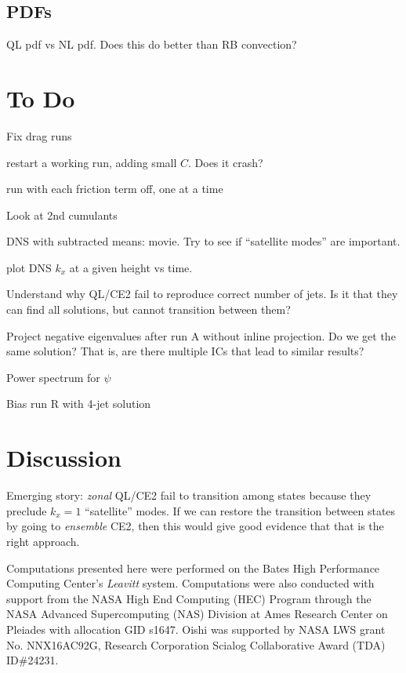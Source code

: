 \documentclass{jfm}
\newcommand{\cmark}{\ding{51}}%
\newcommand{\done}{\rlap{$\square$}{\raisebox{2pt}{\large\hspace{1pt}\cmark}}%
\hspace{-2.5pt}}
\begin{document}
\subsection{PDFs}
\label{sec:pdf}

QL pdf vs NL pdf.
Does this do better than RB convection?

\section{To Do}
\label{sec:todo}

\begin{todolist}
  \item[\done] Fix drag runs
    \begin{todolist}
      \item[\done] restart a working run, adding small $C$. Does it crash?
      \item[\done] run with each friction term off, one at a time
    \end{todolist}
  \item[\done] Look at 2nd cumulants
  \item DNS with subtracted means: movie. Try to see if ``satellite modes'' are important.
  \item plot DNS $k_x$ at a given height vs time.
  \item Understand why QL/CE2 fail to reproduce correct number of jets. Is it that they can find all solutions, but cannot transition between them?
  \item Project negative eigenvalues after run A without inline projection. Do we get the same solution? That is, are there multiple ICs that lead to similar results?
  \item Power spectrum for $\psi$
  \item[\done] Bias run R with 4-jet solution
\end{todolist}

\section{Discussion}
\label{sec:discussion}

Emerging story: \emph{zonal} QL/CE2 fail to transition among states because they preclude $k_x = 1$ ``satellite'' modes. If we can restore the transition between states by going to \emph{ensemble} CE2, then this would give good evidence that that is the right approach.


Computations presented here were performed on the Bates High Performance Computing Center's \emph{Leavitt} system.
Computations were also conducted with support from the NASA High End Computing (HEC) Program through the NASA Advanced Supercomputing (NAS) Division at Ames Research
Center on Pleiades with allocation GID s1647.
Oishi was supported by NASA LWS grant No. NNX16AC92G, Research Corporation Scialog Collaborative Award (TDA) ID\#24231.
\end{document}
